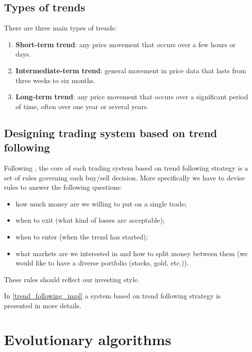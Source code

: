 \subsection{Types of trends}
\label{sec:types_of_trends}

There are three main types of trends:

\begin{enumerate}
  \item \textbf{Short-term trend}: any price movement that occurs over a few hours or days.
  \item \textbf{Intermediate-term trend}: general movement in price data that lasts from three weeks to six months.
  \item \textbf{Long-term trend}: any price movement that occurs over a significant period of time, often over one year or several years.
\end{enumerate}



\subsection{Designing trading system based on trend following} 

Following \cite{Trend01}, the core of each trading system based on trend following strategy is a set of rules governing each buy/sell decision.
More specifically we have to devise rules to answer the following questions:

\begin{itemize}
  \item how much money are we willing to put on a single trade;
  \item when to exit (what kind of losses are acceptable);
  \item when to enter (when the trend has started); 
  \item what markets are we interested in and how to split money between them (we would like to have a diverse portfolio (stocks, gold, etc.)).
\end{itemize}

These rules should reflect our investing style.

In \ref{trend_following_impl} a system based on trend following strategy is presented in more details.


\section{Evolutionary algorithms}
\label{sec:evolAlgorithms}

